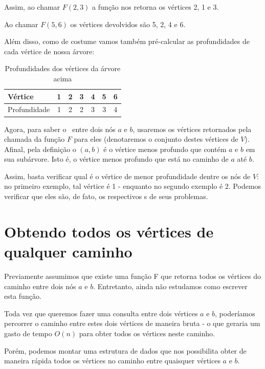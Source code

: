 \vspace{0.5cm}

Assim, ao chamar $F(2, 3)$ a função nos retorna os vértices 2, 1 e 3.

Ao chamar $F(5, 6)$ os vértices devolvidos são 5, 2, 4 e 6.

Além disso, como de costume vamos também pré-calcular as profundidades de cada vértice de nossa árvore:

\begin{table}[htb]
\centering
\begin{tabular}{|l|c|c|c|c|c|c|}
\hline
Vértice      & 1 & 2 & 3 & 4 & 5 & 6  \\ \hline
Profundidade & 1 & 2 & 2 & 3 & 3 & 4 \\ \hline
\end{tabular}
\caption{Profundidades dos vértices da árvore acima}
\end{table}



Agora, para saber o \LCA\ entre dois nós $a$ e $b$, usaremos os vértices retornados pela chamada da função $F$ para eles (denotaremos o conjunto destes vértices de $V$). Afinal, pela definição o \LCA$(a, b)$ é o vértice menos profundo que contém $a$ e $b$ em sua subárvore. Isto é, o vértice menos profundo que está no caminho de $a$ até $b$.

Assim, basta verificar qual é o vértice de menor profundidade dentre os nós de $V$: no primeiro exemplo, tal vértice é 1 - enquanto no segundo exemplo é 2. Podemos verificar que eles são, de fato, os respectivos \LCA s de seus problemas.


\section{Obtendo todos os vértices de qualquer caminho}

Previamente assumimos que existe uma função F que retorna todos os vértices do caminho entre dois nós $a$ e $b$. Entretanto, ainda não estudamos como escrever esta função.

Toda vez que queremos fazer uma consulta entre dois vértices $a$ e $b$, poderíamos percorrer o caminho entre estes dois vértices de maneira bruta - o que geraria um gasto de tempo $O(n)$ para obter todos os vértices neste caminho.

Porém, podemos montar uma estrutura de dados que nos possibilita obter de maneira rápida todos os vértices no caminho entre quaisquer vértices $a$ e $b$.


